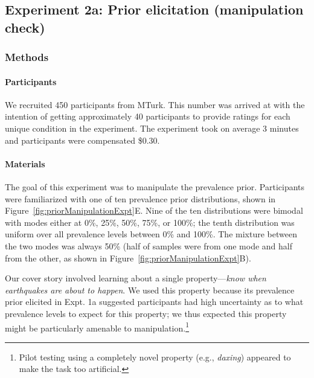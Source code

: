 \documentclass[floatsintext,doc]{apa6}
\let\oldparagraph\paragraph
\renewcommand{\paragraph}[1]{\oldparagraph{#1}\mbox{}}
\let\rmarkdownfootnote\footnote%
\def\footnote{\protect\rmarkdownfootnote}
\begin{document}
\hypertarget{experiment-2a-prior-elicitation-manipulation-check}{%
\subsection{Experiment 2a: Prior elicitation (manipulation check)}\label{experiment-2a-prior-elicitation-manipulation-check}}

\hypertarget{methods-2}{%
\subsubsection{Methods}\label{methods-2}}

\hypertarget{participants-3}{%
\paragraph{Participants}\label{participants-3}}

We recruited 450 participants from MTurk.
This number was arrived at with the intention of getting approximately 40 participants to provide ratings for each unique condition in the experiment.
The experiment took on average 3 minutes and participants were compensated \$0.30.

\hypertarget{materials-1}{%
\paragraph{Materials}\label{materials-1}}

The goal of this experiment was to manipulate the prevalence prior.
Participants were familiarized with one of ten prevalence prior distributions, shown in Figure~\ref{fig:priorManipulationExpt}E.
Nine of the ten distributions were bimodal with modes either at 0\%, 25\%, 50\%, 75\%, or 100\%; the tenth distribution was uniform over all prevalence levels between 0\% and 100\%.
The mixture between the two modes was always 50\% (half of samples were from one mode and half from the other, as shown in Figure~\ref{fig:priorManipulationExpt}B).

Our cover story involved learning about a single property---\emph{know when earthquakes are about to happen}.
We used this property because its prevalence prior elicited in Expt. 1a suggested participants had high uncertainty as to what prevalence levels to expect for this property; we thus expected this property might be particularly amenable to manipulation.\footnote{Pilot testing using a completely novel property (e.g., \emph{daxing}) appeared to make the task too artificial. }
\end{document}
